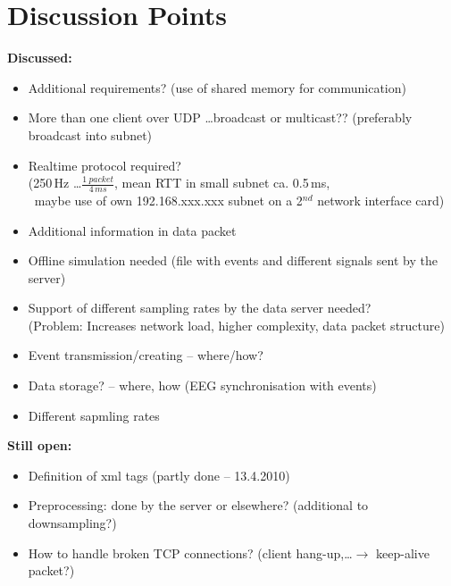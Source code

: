 \documentclass[11pt]{scrartcl}
\begin{document}
\section{Discussion Points}

  \textbf{Discussed:}
  \begin{itemize}
    \item Additional requirements? (use of shared memory for communication)
    \item More than one client over UDP \dots broadcast or multicast?? (preferably broadcast into subnet)
    \item Realtime protocol required?\\
      \hspace*{0.2cm} (250\,Hz \dots $\frac{1~packet}{4\,ms}$, mean RTT in small subnet ca. 0.5\,ms,\\
      \hspace*{0.2cm} ~maybe use of own 192.168.xxx.xxx subnet on a 2$^{nd}$ network interface card)
    \item Additional information in data packet
    \item Offline simulation needed (file with events and different signals sent by the server)
    \item Support of different sampling rates by the data server needed?\\
      \hspace*{0.2cm} (Problem: Increases network load, higher complexity, data packet structure)
    \item Event transmission/creating -- where/how?
    \item Data storage? -- where, how (EEG synchronisation with events)
    \item Different sapmling rates
  \end{itemize}

\textbf{Still open:}
  \begin{itemize}
    \item Definition of xml tags (partly done -- 13.4.2010)
    \item Preprocessing: done by the server or elsewhere? (additional to downsampling?)
    \item How to handle broken TCP connections? (client hang-up,\dots $\rightarrow$ keep-alive packet?)
  \end{itemize}
\end{document}
